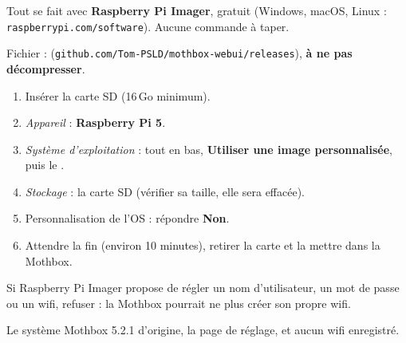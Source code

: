 \documentclass[11pt,a4paper,openany]{report}
\newcommand{\pasc}[2]{\tikz[baseline=(n.base)]\node[circle,fill=#1,text=white,font=\sffamily\bfseries\footnotesize,inner sep=1.5pt,minimum size=1.2em](n){#2};}
\newcommand{\pas}[1]{\pasc{pslrouge}{#1}}
\begin{document}
\begin{minipage}[t]{0.55\textwidth}
\vspace{0pt}
Tout se fait avec \textbf{Raspberry Pi Imager}, gratuit (Windows, macOS, Linux : \texttt{raspberrypi.com/software}). Aucune commande à taper.

Fichier :  (\texttt{github.com/Tom-PSLD/mothbox-webui/releases}), \textbf{à ne pas décompresser}.
\begin{enumerate}[label=\protect\pas{\arabic*},leftmargin=2.2em,itemsep=5pt]
  \item Insérer la carte SD (16\,Go minimum).
  \item \emph{Appareil} : \textbf{Raspberry Pi 5}.
  \item \emph{Système d'exploitation} : tout en bas, \textbf{Utiliser une image personnalisée}, puis le .
  \item \emph{Stockage} : la carte SD (vérifier sa taille, elle sera effacée).
  \item Personnalisation de l'OS : répondre \textbf{Non}.
  \item Attendre la fin (environ 10 minutes), retirer la carte et la mettre dans la Mothbox.
\end{enumerate}
\end{minipage}\hfill
\begin{minipage}[t]{0.4\textwidth}
\vspace{0pt}
\begin{attention}
Si Raspberry Pi Imager propose de régler un nom d'utilisateur, un mot de passe ou un wifi, refuser : la Mothbox pourrait ne plus créer son propre wifi.
\end{attention}
\begin{astuce}
Le système Mothbox 5.2.1 d'origine, la page de réglage, et aucun wifi enregistré.
\end{astuce}
\end{minipage}
\end{document}
